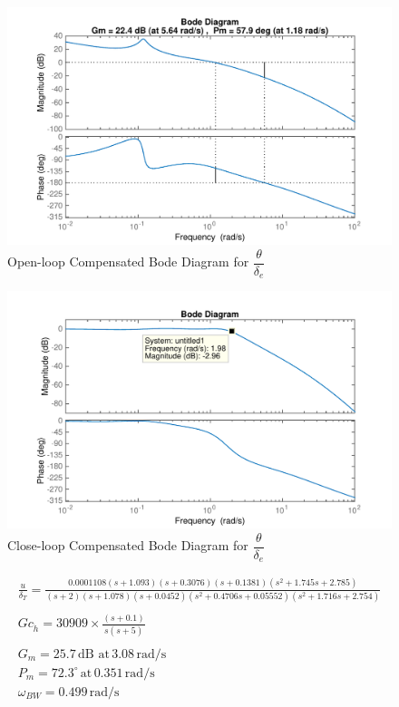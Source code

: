 \documentclass[11pt]{article}
\begin{document}
\begin{figure}[h!]
\begin{center}
\includegraphics[height=.4\textheight]{figures/open_comp_theta}
\caption{Open-loop Compensated Bode Diagram for $\dfrac{\theta}{\delta_e}$}
\end{center}
\end{figure}

\begin{figure}[h!]
\begin{center}
\includegraphics[height=.4\textheight]{figures/close_comp_theta}
\caption{Close-loop Compensated Bode Diagram for $\dfrac{\theta}{\delta_e}$}
\end{center}
\end{figure}

\begin{gather*}
\frac{u}{\delta_T}=\frac{0.0001108 (s+1.093) (s+0.3076) (s+0.1381) (s^2 + 1.745s + 2.785)}{(s+2) (s+1.078) (s+0.0452) (s^2 + 0.4706s + 0.05552) (s^2 + 1.716s + 2.754)} \\
\\
\boxed{Gc_{\dot{h}} = 30909 \times \frac{(s+0.1)}{s(s+5)}} \\
\\
G_m=25.7\,\mathrm{dB\,\, at\,} 3.08 \,\mathrm{rad/s}  \\
P_m=72.3^{\circ}\, \mathrm{at}\, 0.351 \,\mathrm{rad/s} \\
\omega_{BW}=0.499\, \mathrm{rad/s}\\
\end{gather*}
\end{document}
